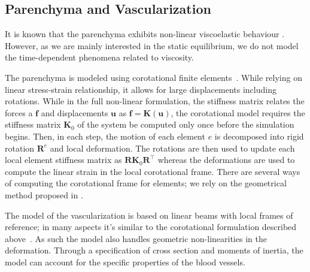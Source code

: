 \documentclass{llncs}
\newcommand{\Vec}[1]{\mathbf{#1}}
\newcommand{\Mat}[1]{\mathbf{#1}}
\begin{document}
\subsection{Parenchyma and Vascularization} %

It is known that the parenchyma exhibits non-linear viscoelastic behaviour \cite{Marchesseau2010}.
However, as we are mainly interested in the static equilibrium, we do not model the time-dependent
phenomena related to viscosity.


The parenchyma is modeled using corotational finite elements~\cite{Felippa2005}.
While relying on linear stress-strain relationship, it allows for large displacements including rotations. 
While in the full non-linear formulation, the stiffness matrix relates the forces a $\Vec{f}$ and 
displacements $\Vec{u}$ as $\Vec{f} = \Mat{K}(\Vec{u})$, the corotational model 
requires the stiffness matrix $\Mat{K}_0$ of the system be computed only once before the simulation begins. 
Then, in each step, the motion of each element $e$ is decomposed into rigid rotation $\Mat{R}^e$ and local deformation. 
The rotations are then used to update each local element stiffness matrix as $\Mat{R}\Mat{K}_0\Mat{R}^{\top}$
whereas the deformations are used to compute the linear strain in the local corotational frame.
There are several ways of computing the corotational frame for elements; we rely on
the geometrical method proposed in \cite{Nesme2005}.

The model of the vascularization is based on linear beams 
with local frames of reference; in many aspects it's similar to the
corotational formulation described above~\cite{Duriez2006}. As such the model also handles geometric
non-linearities in the deformation. Through a specification of cross section and moments of inertia, 
the model can account for the specific properties of the blood vessels. 
\end{document}
